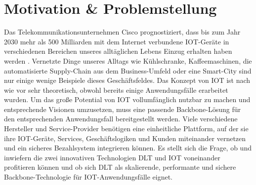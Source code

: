 %
%
\section{Motivation \& Problemstellung}
\label{sec:intro:motivation}
Das Telekommunikationsunternehmen Cisco prognostiziert, dass bis zum Jahr 2030 mehr als 500 Milliarden mit dem Internet verbundene \ac{IOT}-Geräte in verschiedenen Bereichen unseres alltäglichen Lebens Einzug erhalten haben werden \cite{cisco2016}. Vernetzte Dinge unseres Alltags wie Kühlschranke, Kaffeemaschinen, die automatisierte Supply-Chain aus dem Business-Umfeld oder eine Smart-City sind nur einige wenige Beispiele dieses Geschäftsfeldes. Das Konzept von \ac{IOT} ist nach wie vor sehr theoretisch, obwohl bereits einige Anwendungsfälle erarbeitet wurden. Um das große Potential von \ac{IOT} vollumfänglich nutzbar zu machen und entsprechende Visionen umzusetzen, muss eine passende Backbone-Lösung für den entsprechenden Anwendungsfall bereitgestellt werden. Viele verschiedene Hersteller und Service-Provider benötigen eine einheitliche Plattform, auf der sie ihre \ac{IOT}-Geräte, Services, Geschäftslogiken und Kunden miteinander vernetzen und ein sicheres Bezahlsystem integrieren können. Es stellt sich die Frage, ob und inwiefern die zwei innovativen Technologien \ac{DLT} und \ac{IOT} voneinander profitieren können und ob sich \ac{DLT} als skalierende, performante und sichere Backbone-Technologie für \ac{IOT}-Anwendungsfälle eignet.

%
%

